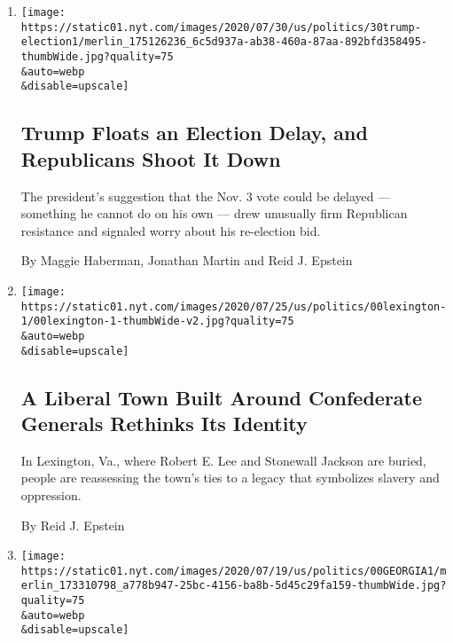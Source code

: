 \begin{enumerate}
\def\labelenumi{\arabic{enumi}.}
\item
  \href{/2020/07/30/us/politics/trump-delay-2020-election.html}{}

  \texttt{[image: https://static01.nyt.com/images/2020/07/30/us/politics/30trump-election1/merlin\_175126236\_6c5d937a-ab38-460a-87aa-892bfd358495-thumbWide.jpg?quality=75\\\&auto=webp\\\&disable=upscale]}

  \hypertarget{trump-floats-an-election-delay-and-republicans-shoot-it-down}{%
  \subsection{Trump Floats an Election Delay, and Republicans Shoot It
  Down}\label{trump-floats-an-election-delay-and-republicans-shoot-it-down}}

  The president's suggestion that the Nov. 3 vote could be delayed ---
  something he cannot do on his own --- drew unusually firm Republican
  resistance and signaled worry about his re-election bid.

  By Maggie Haberman, Jonathan Martin and Reid J. Epstein
\item
  \href{/2020/07/26/us/politics/lexington-va-confederate-generals.html}{}

  \texttt{[image: https://static01.nyt.com/images/2020/07/25/us/politics/00lexington-1/00lexington-1-thumbWide-v2.jpg?quality=75\\\&auto=webp\\\&disable=upscale]}

  \hypertarget{a-liberal-town-built-around-confederate-generals-rethinks-its-identity}{%
  \subsection{A Liberal Town Built Around Confederate Generals Rethinks
  Its
  Identity}\label{a-liberal-town-built-around-confederate-generals-rethinks-its-identity}}

  In Lexington, Va., where Robert E. Lee and Stonewall Jackson are
  buried, people are reassessing the town's ties to a legacy that
  symbolizes slavery and oppression.

  By Reid J. Epstein
\item
  \href{/2020/07/25/us/politics/georgia-election-voting-problems.html}{}

  \texttt{[image: https://static01.nyt.com/images/2020/07/19/us/politics/00GEORGIA1/merlin\_173310798\_a778b947-25bc-4156-ba8b-5d45c29fa159-thumbWide.jpg?quality=75\\\&auto=webp\\\&disable=upscale]}


\end{enumerate}
